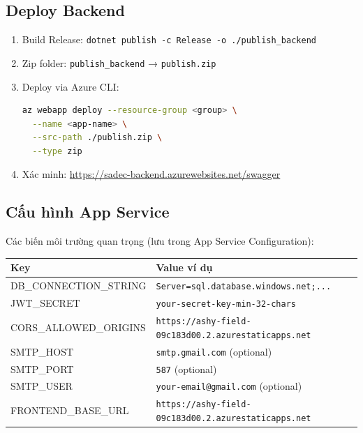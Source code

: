 \documentclass[12pt,a4paper,oneside]{report}
\newcommand{\SwaggerUrl}{https://sadec-backend.azurewebsites.net/swagger}
\begin{document}
\subsection{Deploy Backend}

\begin{enumerate}[itemsep=2pt]
  \item Build Release: \texttt{dotnet publish -c Release -o ./publish\_backend}
  \item Zip folder: \texttt{publish\_backend} → \texttt{publish.zip}
  \item Deploy via Azure CLI:
  \begin{lstlisting}[language=bash,caption={Deploy backend}]
az webapp deploy --resource-group <group> \
  --name <app-name> \
  --src-path ./publish.zip \
  --type zip
  \end{lstlisting}
  \item Xác minh: \url{\SwaggerUrl}
\end{enumerate}

\subsection{Cấu hình App Service}

Các biến môi trường quan trọng (lưu trong App Service Configuration):

\begin{center}
\begin{tabular}{|l|p{5cm}|}
\hline
\textbf{Key} & \textbf{Value ví dụ} \\
\hline
DB\_CONNECTION\_STRING & \texttt{Server=sql.database.windows.net;...} \\
\hline
JWT\_SECRET & \texttt{your-secret-key-min-32-chars} \\
\hline
CORS\_ALLOWED\_ORIGINS & \texttt{https://ashy-field-09c183d00.2.azurestaticapps.net} \\
\hline
SMTP\_HOST & \texttt{smtp.gmail.com} (optional) \\
\hline
SMTP\_PORT & \texttt{587} (optional) \\
\hline
SMTP\_USER & \texttt{your-email@gmail.com} (optional) \\
\hline
FRONTEND\_BASE\_URL & \texttt{https://ashy-field-09c183d00.2.azurestaticapps.net} \\
\hline
\end{tabular}
\end{center}

\end{document}
